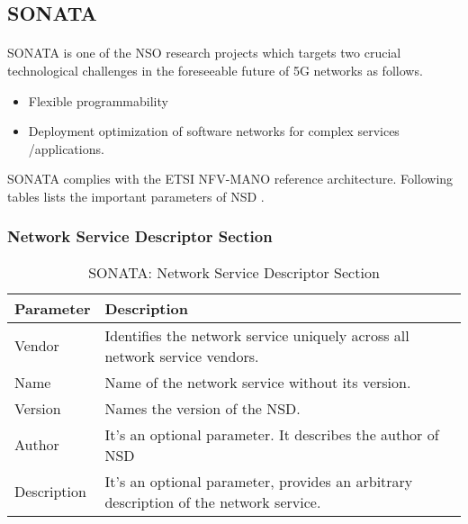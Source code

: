 \subsection{SONATA}
\paragraph{}
SONATA is one of the NSO research projects which targets two crucial technological challenges in the foreseeable future of 5G networks as follows\cite{SONATA}.
\begin{itemize}
    \item Flexible programmability
    \item Deployment optimization of software networks for complex services /applications.
\end{itemize}
SONATA complies with the ETSI NFV-MANO reference architecture. Following tables lists the important parameters of NSD \cite{SONATASchemaDocumentation}.
\subsubsection{Network Service Descriptor Section}
    \begin{table}[h]
    \centering
    \begin{tabular}{ |p{4cm}|p{10cm}|}
        \hline
        \textbf{Parameter} & \textbf{Description} \\
        \hline
         
         Vendor & Identifies the network service uniquely across all network service vendors. \\
         \hline
         Name & Name of the network service without its version. \\
         \hline
         Version & Names the version of the NSD. \\
         \hline
         Author & It's an optional parameter. It describes the author of NSD \\
         \hline
         Description & It's an optional parameter, provides an arbitrary description of the network service. \\
         \hline
    \end{tabular}
    \caption{SONATA: Network Service Descriptor Section}
    \label{tab:SONATA_general_section}
\end{table}
